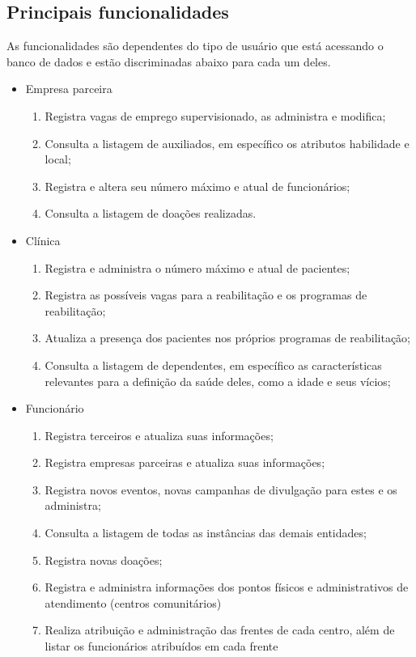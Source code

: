 \subsection{Principais funcionalidades}
As funcionalidades são dependentes do tipo de usuário que está acessando o banco de dados e estão discriminadas abaixo para cada um deles.
\begin{itemize}
    \item Empresa parceira
        \begin{enumerate}
            \item Registra vagas de emprego supervisionado, as administra e modifica;
            \item Consulta a listagem de auxiliados, em específico os atributos habilidade e local;
            \item Registra e altera seu número máximo e atual de funcionários;
            \item Consulta a listagem de doações realizadas.
        \end{enumerate}

        
    \item Clínica
        \begin{enumerate}
            \item Registra e administra o número máximo e atual de pacientes;
            \item Registra as possíveis vagas para a reabilitação e os programas de reabilitação;
            \item Atualiza a presença dos pacientes nos próprios programas de reabilitação;
            \item Consulta a listagem de dependentes, em específico as características relevantes para a definição da saúde deles, como a idade e seus vícios;
        \end{enumerate}

        
    \item Funcionário
        \begin{enumerate}
            \item Registra terceiros e atualiza suas informações;
            \item Registra empresas parceiras e atualiza suas informações;
            \item Registra novos eventos, novas campanhas de divulgação para estes e os administra;
            \item Consulta a listagem de todas as instâncias das demais entidades;
            \item Registra novas doações;
            \item Registra e administra informações dos pontos físicos e administrativos de atendimento (centros comunitários)
            \item Realiza atribuição e administração das frentes de cada centro, além de listar os funcionários atribuídos em cada frente
        \end{enumerate}


\end{itemize}
